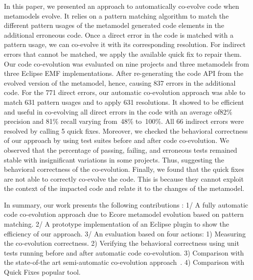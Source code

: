 In this paper, we presented an approach to automatically co-evolve code when metamodels evolve. It relies on a pattern matching algorithm to match the different pattern usages of the metamodel generated code elements in the additional erroneous code. Once a direct error in the code is matched with a pattern usage, we can co-evolve it with its corresponding resolution. 
For indirect errors that cannot be matched, we apply the available quick fix to repair them. 
%
Our code co-evolution was evaluated on nine projects and three metamodels from three Eclipse EMF implementations. After re-generating the code API from the evolved version of the metamodel, hence, causing 837 errors in the additional code.
For the 771 direct errors, our automatic co-evolution approach was able to match 631 pattern usages and to apply 631 resolutions. It showed to be efficient and useful in co-evolving all direct errors in the code with an average of82\% precision and 81\% recall varying from~48\% to~100\%. All 66 indirect errors were resolved by calling 5 quick fixes. Moreover, we checked the behavioral correctness of our approach by using test suites before and after code co-evolution. We observed that the percentage of passing, failing, and erroneous tests remained stable with insignificant variations in some projects. Thus, suggesting the behavioral correctness of the co-evolution. Finally, we found that the quick fixes are not able to correctly co-evolve the code. This is because they cannot exploit the context of the impacted code and relate it to the changes of the metamodel. 


In summary, our work presents the following contributions :
1/ A fully automatic code co-evolution approach due to Ecore metamodel evolution based on pattern matching. 
2/ A prototype implementation of an Eclipse plugin to show the efficiency of our approach. %
3/ An evaluation based on four actions: 1) Measuring the co-evolution correctness. 2) Verifying the behavioral correctness using unit tests running before and after automatic code co-evolution. 3) Comparison with the state-of-the art semi-automatic co-evolution approach~\cite{Khelladi2020}. 4) Comparison with Quick Fixes popular tool.



